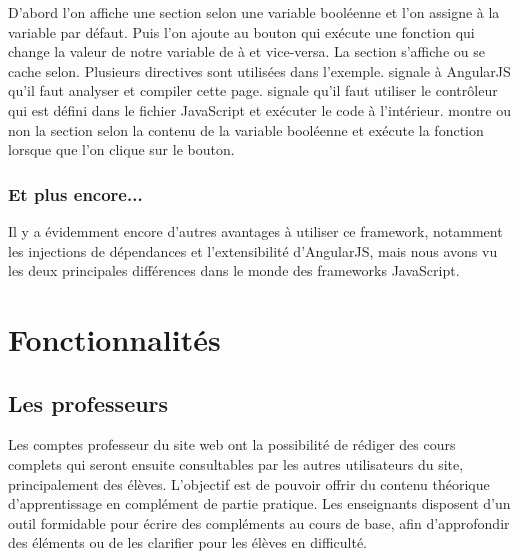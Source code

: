 \documentclass[letterpaper,10pt,oneside]{sphinxmanual}
\begin{document}
D'abord l'on affiche une section selon une variable booléenne  et l'on assigne à la variable  par défaut. Puis l'on ajoute au bouton qui exécute une fonction qui change la valeur de notre variable  de  à  et vice-versa. La section s'affiche ou se cache selon. Plusieurs directives sont utilisées dans l'exemple.  signale à AngularJS qu'il faut analyser et compiler cette page.  signale qu'il faut utiliser le contrôleur  qui est défini dans le fichier JavaScript et exécuter le code à l'intérieur.  montre ou non la section selon la contenu de la variable booléenne  et  exécute la fonction  lorsque que l'on clique sur le bouton.


\subsection{Et plus encore...}
\label{angularjs:et-plus-encore}
Il y a évidemment encore d'autres avantages à utiliser ce framework, notamment les injections de dépendances et l'extensibilité d'AngularJS, mais nous avons vu les deux principales différences dans le monde des frameworks JavaScript.


\chapter{Fonctionnalités}
\label{functionalities:fonctionnalites}\label{functionalities::doc}

\section{Les professeurs}
\label{functionalities:les-professeurs}
Les comptes professeur du site web ont la possibilité de rédiger des cours complets qui seront ensuite consultables par les autres utilisateurs du site, principalement des élèves. L'objectif est de pouvoir offrir du contenu théorique d'apprentissage en complément de partie pratique. Les enseignants disposent d'un outil formidable pour écrire des compléments au cours de base, afin d'approfondir des éléments ou de les clarifier pour les élèves en difficulté.
\end{document}
